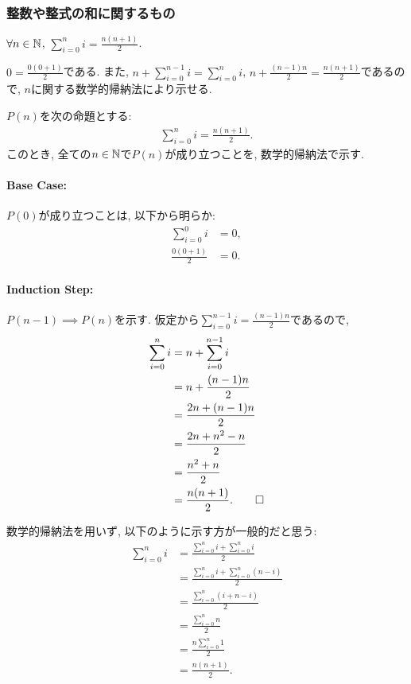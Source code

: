 \subsubsection{整数や整式の和に関するもの}
\begin{prop}
  \label{p:20230630}
  $\forall n\in\mathbb{N}$,
  $\sum_{i=0}^{n}i=\frac{n(n+1)}{2}$.
\end{prop}
\begin{proof**}
  $0=\frac{0(0+1)}{2}$である.
  また,
  $n+\sum_{i=0}^{n-1}i=\sum_{i=0}^{n}i$,
  $n+\frac{(n-1)n}{2}=\frac{n(n+1)}{2}$であるので,
  $n$に関する数学的帰納法により示せる.
\end{proof**}
\begin{proof*}
  $P(n)$を次の命題とする:
  \begin{align*}
    \sum_{i=0}^{n}i=\frac{n(n+1)}{2}.
  \end{align*}
  このとき, 全ての$n\in\mathbb{N}$で$P(n)$が成り立つことを,
  数学的帰納法で示す.

  \paragraph{Base Case:}
  $P(0)$が成り立つことは, 以下から明らか:
  \begin{align*}
    \sum_{i=0}^{0}i&=0,\\
    \frac{0(0+1)}{2}&=0.
  \end{align*}

  \paragraph{Induction Step:}
  $P(n-1)\implies P(n)$を示す.
  仮定から$\sum_{i=0}^{n-1}i=\frac{(n-1)n}{2}$であるので,
  \begin{align*}
    \sum_{i=0}^{n}i&=n+\sum_{i=0}^{n-1}i\\
    &=n+\frac{(n-1)n}{2}\\
    &=\frac{2n+(n-1)n}{2}\\
    &=\frac{2n+n^2-n}{2}\\
    &=\frac{n^2+n}{2}\\
    &=\frac{n(n+1)}{2}.
    \qedhere
  \end{align*}
\end{proof*}
\begin{rem}
  数学的帰納法を用いず, 以下のように示す方が一般的だと思う:
  \begin{align*}
    \sum_{i=0}^{n}i&=\frac{\sum_{i=0}^{n}i + \sum_{i=0}^{n}i}{2}\\
    &=\frac{\sum_{i=0}^{n}i + \sum_{i=0}^{n}(n-i)}{2}\\
    &=\frac{\sum_{i=0}^{n}(i + n-i)}{2}\\
    &=\frac{\sum_{i=0}^{n}n}{2}\\
    &=\frac{n\sum_{i=0}^{n}1}{2}\\
    &=\frac{n(n+1)}{2}.
  \end{align*}
\end{rem}

